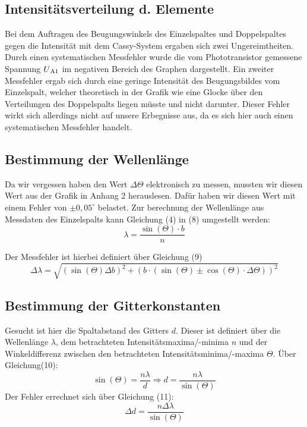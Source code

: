 \documentclass[11pt]{article}
\begin{document}
\subsection{Intensitätsverteilung d. Elemente}
Bei dem Auftragen des Beugungswinkels des Einzelspaltes und Doppelspaltes gegen die Intensität mit dem Cassy-System ergaben sich zwei Ungereimtheiten. Durch einen systematischen Messfehler wurde die vom Phototransistor gemessene Spannung $U\textsubscript{A1}$ im negativen Bereich des Graphen dargestellt. Ein zweiter Messfehler ergab sich durch eine geringe Intensität des Beugungsbildes vom Einzelspalt, welcher theoretisch in der Grafik wie eine Glocke über den Verteilungen des Doppelspalts liegen müsste und nicht darunter. Dieser Fehler wirkt sich allerdings nicht auf unsere Erbegnisse aus, da es sich hier auch einen systematischen Messfehler handelt. 

\subsection{Bestimmung der Wellenlänge}
Da wir vergessen haben den Wert $\Delta \Theta$ elektronisch zu messen, mussten wir diesen Wert aus der Grafik in Anhang 2 herauslesen. Dafür haben wir diesen Wert mit einem Fehler von $\pm 0,05^\circ$ belastet. Zur berechnung der Wellenlänge aus Messdaten des Einzelspalts kann Gleichung (4) in (8) umgestellt werden:
	\begin{equation}
	\lambda =\frac{\sin(\Theta )\cdot b}{n}
	\end{equation}

Der Messfehler ist hierbei definiert über Gleichung (9)
	\begin{equation}
	\Delta\lambda = \sqrt{(\sin(\Theta )\Delta b)^2+(b\cdot (\sin(\Theta )\pm\cos(\Theta )\cdot \Delta\Theta) )^2}
	\end{equation}

\subsection{Bestimmung der Gitterkonstanten}
Gesucht ist hier die Spaltabstand des Gitters $d$. Dieser ist definiert über die Wellenlänge $\lambda$, dem betrachteten Intensitätsmaxima/-minima $n$ und der Winkeldifferenz zwischen den betrachteten Intensitätsminima/-maxima $\Theta$. Über Gleichung(10):
\begin{equation}
\sin(\Theta )=\frac{n\lambda}{d}\Rightarrow d=\frac{n\lambda}{\sin(\Theta )}
\end{equation}
Der Fehler errechnet sich über Gleichung (11):
\begin{equation}
\Delta d=\frac{n\Delta\lambda}{\sin(\Theta )}	
\end{equation}
\end{document}
